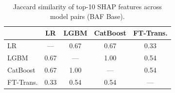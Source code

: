 \begin{table}[ht!]
\centering
\caption{Jaccard similarity of top-10 SHAP features across model pairs (BAF Base).}
\label{tab:shap_consistency}
\begin{tabular}{l c c c c}
\toprule
          & LR & LGBM & CatBoost & FT-Trans. \\
\midrule
LR         & --- & 0.67 & 0.67 & 0.33 \\
LGBM       & 0.67 & --- & 1.00 & 0.54 \\
CatBoost   & 0.67 & 1.00 & --- & 0.54 \\
FT-Trans.  & 0.33 & 0.54 & 0.54 & --- \\
\bottomrule
\end{tabular}
\end{table}